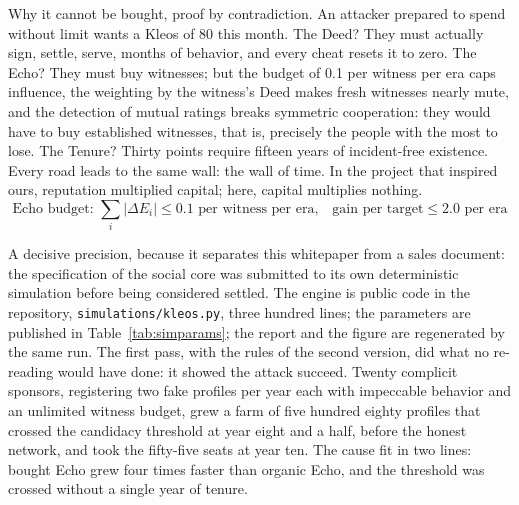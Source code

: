 Why it cannot be bought, proof by contradiction. An attacker prepared to
spend without limit wants a Kleos of 80 this month. The Deed? They must
actually sign, settle, serve, months of behavior, and every cheat resets
it to zero. The Echo? They must buy witnesses; but the budget of 0.1 per
witness per era caps influence, the weighting by the witness's Deed makes
fresh witnesses nearly mute, and the detection of mutual ratings breaks
symmetric cooperation: they would have to buy established witnesses,
that is, precisely the people with the most to lose. The Tenure? Thirty
points require fifteen years of incident-free existence. Every road leads
to the same wall: the wall of time. In the project that inspired ours,
reputation multiplied capital; here, capital multiplies nothing.
\begin{equation}\label{eq:echo}
\text{Echo budget: } \sum_i |\Delta E_i| \le 0.1 \text{ per witness per era,}
\quad \text{gain per target} \le 2.0 \text{ per era}
\end{equation}

A decisive precision, because it separates this whitepaper from a sales
document: the specification of the social core was submitted to its own
deterministic simulation before being considered settled. The engine is
public code in the repository, \texttt{simulations/kleos.py}, three
hundred lines; the parameters are published in
Table~\ref{tab:simparams}; the report and the figure are regenerated by
the same run. The first pass, with the rules of the second version, did
what no re-reading would have done: it showed the attack succeed. Twenty
complicit sponsors, registering two fake profiles per year each with
impeccable behavior and an unlimited witness budget, grew a farm of five
hundred eighty profiles that crossed the candidacy threshold at year
eight and a half, before the honest network, and took the fifty-five
seats at year ten. The cause fit in two lines: bought Echo grew four
times faster than organic Echo, and the threshold was crossed without a
single year of tenure.


